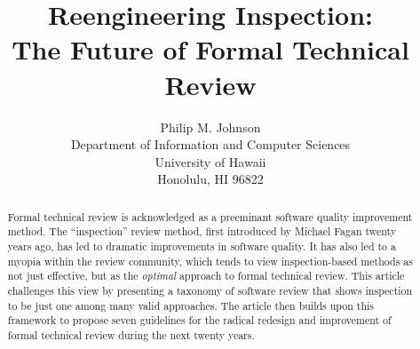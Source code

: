 

                

\title{{\bf Reengineering Inspection: \\
       The Future of Formal Technical Review}}

\author{Philip M. Johnson\\
        Department of Information and Computer Sciences\\
        University of Hawaii\\
        Honolulu, HI 96822}


\maketitle

\begin{abstract}

  Formal technical review is acknowledged as a preeminant software
  quality improvement method. The ``inspection'' review method, first
  introduced by Michael Fagan twenty years ago, has led to dramatic
  improvements in software quality. It has also led to a myopia within
  the review community, which tends to view inspection-based methods as
  not just effective, but as the {\em optimal} approach to formal
  technical review.  This article challenges this view by presenting a
  taxonomy of software review that shows inspection to be just one among
  many valid approaches. The article then builds upon this framework to propose
  seven guidelines for the radical redesign and improvement of formal
  technical review during the next twenty years.

\end{abstract}

